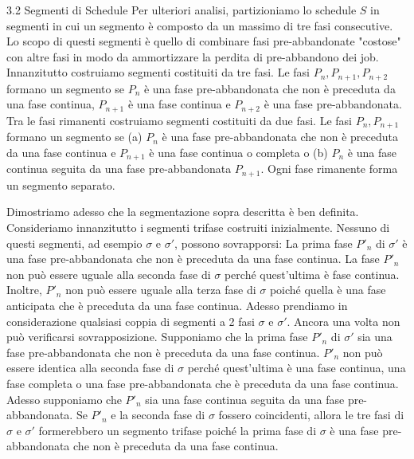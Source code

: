 \documentclass[12pt]{article}
\begin{document}
3.2 Segmenti di Schedule
Per ulteriori analisi, partizioniamo lo schedule $S$ in segmenti in cui un segmento è composto da un massimo di tre fasi consecutive. Lo scopo di questi segmenti è quello di combinare fasi pre-abbandonate "costose" con altre fasi in modo da ammortizzare la perdita di pre-abbandono dei job. Innanzitutto costruiamo segmenti costituiti da tre fasi. Le fasi $P_{n}, P_{n + 1}, P_{n + 2}$ formano un segmento se $P_{n}$ è una fase pre-abbandonata che non è preceduta da una fase continua, $P_{n + 1}$ è una fase continua e $P_{n + 2}$ è una fase pre-abbandonata. Tra le fasi rimanenti costruiamo segmenti costituiti da due fasi. Le fasi $P_{n}, P_{n + 1}$ formano un segmento se (a) $P_{n}$ è una fase pre-abbandonata che non è preceduta da una fase continua e $P_{n + 1}$ è una fase continua o completa o (b) $P_{n}$ è una fase continua seguita da una fase pre-abbandonata $P_{n + 1}$. Ogni fase rimanente forma un segmento separato. 

Dimostriamo adesso che la segmentazione sopra descritta è ben definita. Consideriamo innanzitutto i segmenti trifase costruiti inizialmente. Nessuno di questi segmenti, ad esempio $\sigma$ e $\sigma'$, possono sovrapporsi: La prima fase $P'_{n}$ di $\sigma'$ è una fase pre-abbandonata che non è preceduta da una fase continua. La fase $P'_{n}$ non può essere uguale alla seconda fase di $\sigma$ perché quest'ultima è fase continua. Inoltre, $P'_{n}$ non può essere uguale alla terza fase di $\sigma$ poiché quella è una fase anticipata che è preceduta da una fase continua. Adesso prendiamo in considerazione qualsiasi coppia di segmenti a 2 fasi $\sigma$ e $\sigma'$. Ancora una volta non può verificarsi sovrapposizione. Supponiamo che la prima fase $P'_{n}$ di $\sigma'$ sia una fase pre-abbandonata che non è preceduta da una fase continua. $P'_{n}$ non può essere identica alla seconda fase di $\sigma$ perché quest'ultima è una fase continua, una fase completa o una fase pre-abbandonata che è preceduta da una fase continua. Adesso supponiamo che $P'_{n}$ sia una fase continua seguita da una fase pre-abbandonata. Se $P'_{n}$ e la seconda fase di $\sigma$ fossero coincidenti, allora le tre fasi di $\sigma$ e $\sigma'$ formerebbero un segmento trifase poiché la prima fase di $\sigma$ è una fase pre-abbandonata che non è preceduta da una fase continua.
\end{document}
